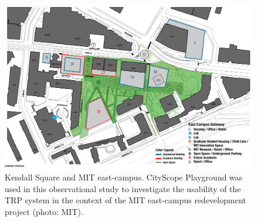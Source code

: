 {{        \begin{figure}[!htb]
            \begin{center}
                \includegraphics[width=.75\textwidth]{chapters/transformation/playground/figures/playground0.png}
            \end{center}
            \caption{Kendall Square and MIT east-campus. CityScope Playground was used in this observational study to investigate the usability of the TRP system in the context of the MIT east-campus redevelopment project (photo: MIT).}
            \label{fig:pg_kendall_site}
        \end{figure}

}}
